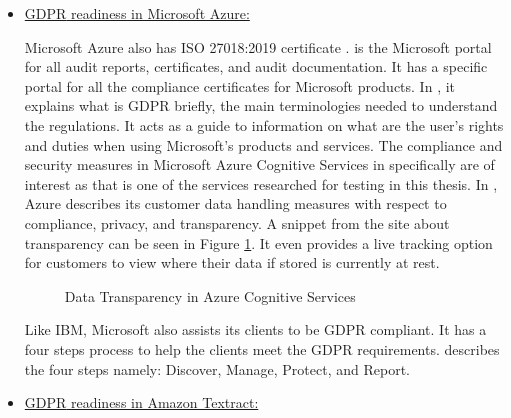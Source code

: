 \begin{itemize}
    \item \underline{\acs{GDPR} readiness in Microsoft Azure:}
    
    Microsoft Azure also has \acs{ISO} 27018:2019 certificate \cite{azureisocert}. \cite{azurecompliance} is the Microsoft portal for all audit reports, certificates, and audit documentation. It has a specific portal \cite{azureservicetrustportal} for all the compliance certificates for Microsoft products. In \cite{azuregdpr}, it explains what is \acs{GDPR} briefly, the main terminologies needed to understand the regulations. It acts as a guide to information on what are the user's rights and duties when using Microsoft's products and services. The compliance and security measures in Microsoft Azure Cognitive Services in specifically are of interest as that is one of the services researched for testing in this thesis. In \cite{azuregdprcompliance}, Azure describes its customer data handling measures with respect to compliance, privacy, and transparency. A snippet from the site about transparency can be seen in Figure \ref{azuretransparency}. It even provides a live tracking \cite{azuredatamap} option for customers to view where their data if stored is currently at rest. 

    \begin {figure}[ht]
    \centering
    \caption{Data Transparency in Azure Cognitive Services}
    \label{azuretransparency}
    \end {figure}
    Like IBM, Microsoft also assists its clients to be \acs{GDPR} compliant. It has a four steps process to help the clients meet the \acs{GDPR} requirements. \cite{azuregdpr2} describes the four steps namely: Discover, Manage, Protect, and Report.
    
    \item \underline{\acs{GDPR} readiness in Amazon Textract:}


\end{itemize}
